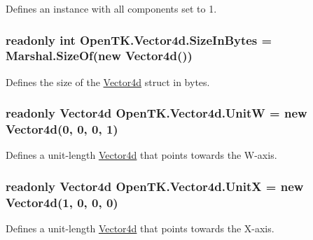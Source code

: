 Defines an instance with all components set to 1. 

\hypertarget{struct_open_t_k_1_1_vector4d_a9e70f61574922798bf2ff182ffc82cb5}{
\subsubsection[{Size\-In\-Bytes}]{\setlength{\rightskip}{0pt plus 5cm}readonly int Open\-T\-K.\-Vector4d.\-Size\-In\-Bytes = Marshal.\-Size\-Of(new {\bf Vector4d}())\hspace{0.3cm}{\ttfamily [static]}}}\label{struct_open_t_k_1_1_vector4d_a9e70f61574922798bf2ff182ffc82cb5}


Defines the size of the \hyperlink{struct_open_t_k_1_1_vector4d}{Vector4d} struct in bytes. 

\hypertarget{struct_open_t_k_1_1_vector4d_aed38a8e576f79b30e7310255089e3e3e}{
\subsubsection[{Unit\-W}]{\setlength{\rightskip}{0pt plus 5cm}readonly {\bf Vector4d} Open\-T\-K.\-Vector4d.\-Unit\-W = new {\bf Vector4d}(0, 0, 0, 1)\hspace{0.3cm}{\ttfamily [static]}}}\label{struct_open_t_k_1_1_vector4d_aed38a8e576f79b30e7310255089e3e3e}


Defines a unit-\/length \hyperlink{struct_open_t_k_1_1_vector4d}{Vector4d} that points towards the W-\/axis. 

\hypertarget{struct_open_t_k_1_1_vector4d_a8b680bfc1a34f35c9b6c1f86c4d13a78}{
\subsubsection[{Unit\-X}]{\setlength{\rightskip}{0pt plus 5cm}readonly {\bf Vector4d} Open\-T\-K.\-Vector4d.\-Unit\-X = new {\bf Vector4d}(1, 0, 0, 0)\hspace{0.3cm}{\ttfamily [static]}}}\label{struct_open_t_k_1_1_vector4d_a8b680bfc1a34f35c9b6c1f86c4d13a78}


Defines a unit-\/length \hyperlink{struct_open_t_k_1_1_vector4d}{Vector4d} that points towards the X-\/axis. 

